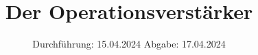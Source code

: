 

\subject{VERSUCH NUMMER 51}
\title{Der Operationsverstärker}
\date{
  Durchführung: 15.04.2024
  \hspace{3em}
  Abgabe: 17.04.2024
}



\maketitle
\thispagestyle{empty}
\tableofcontents
\newpage
\setcounter{page}{1}







\newpage
\printbibliography
\nocite{ap51}
\nocite{matplotlib}
\nocite{numpy}
\nocite{scipy}
\nocite{uncertainties}
\nocite{reback2020pandas}

\newpage






